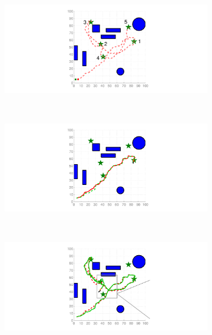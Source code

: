 \documentclass[journal]{IEEEtran}
\begin{document}
    	\begin{figure}
		\centering
		\begin{subfigure}{0.23\textwidth}
			\includegraphics[width=\textwidth]{figures/01}
			\caption{}
			\label{fig:ref_traj_h}
		\end{subfigure}
		~
		\begin{subfigure}{0.23\textwidth}
			\includegraphics[width=\textwidth]{figures/02}
			\caption{}
			\label{fig:ref_traj_obs1}
		\end{subfigure}
		~
		\begin{subfigure}{0.23\textwidth}
			\includegraphics[width=1.05\textwidth]{figures/031}

\end{subfigure}
\end{figure}
\end{document}
